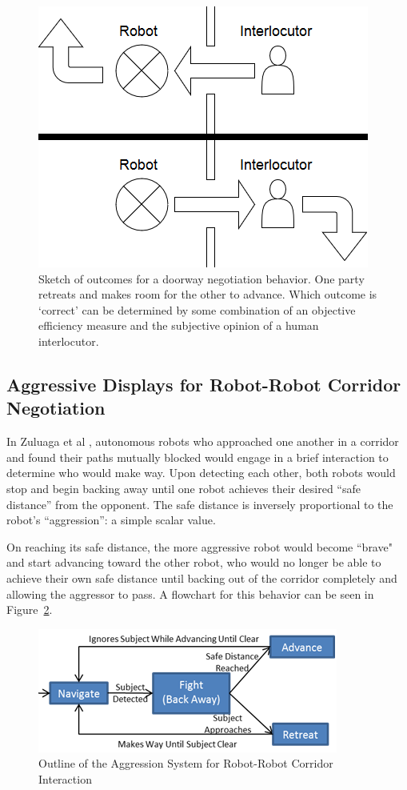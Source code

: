 \documentclass[letterpaper, 10 pt, conference]{ieeeconf}  %
\begin{document}
    \begin{figure}
      \centering
      \includegraphics[width=0.6\columnwidth]{wireframe.png}
      \caption{Sketch of outcomes for a doorway negotiation behavior. One party retreats and makes room for the other to advance. Which outcome is `correct' can be determined by some combination of an objective efficiency measure and the subjective opinion of a human interlocutor.}
      \label{fig:Wireframe}
   \end{figure}

\subsection{Aggressive Displays for Robot-Robot Corridor Negotiation}

In Zuluaga et al \cite{c1}, autonomous robots who approached one another in a corridor and found their paths mutually blocked would engage in a brief interaction to determine who would make way. Upon detecting each other, both robots would stop and begin backing away until one robot achieves their desired ``safe distance'' from the opponent. The safe distance is inversely proportional to the robot's ``aggression'': a simple scalar value.

On reaching its safe distance, the more aggressive robot would become ``brave" and start advancing toward the other robot, who would no longer be able to achieve their own safe distance until backing out of the corridor completely and allowing the aggressor to pass. A flowchart for this behavior can be seen in Figure~\ref{fig:Aggressive}.
 
    \begin{figure}
      \centering
      \includegraphics{aggressive_behavior.png}
      \caption{Outline of the Aggression System for Robot-Robot Corridor Interaction}
      \label{fig:Aggressive}
   \end{figure}
 
\end{document}
